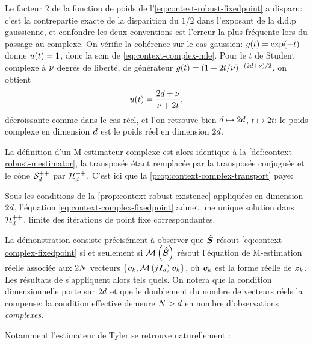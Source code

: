 \begin{remark}
  Le facteur $2$ de la fonction de poids de l'\cref{eq:context-robust-fixedpoint} a disparu: c'est la contrepartie exacte de la disparition du $1/2$ dans l'exposant de la d.d.p gaussienne, et confondre les deux conventions est l'erreur la plus fréquente lors du passage au complexe. On vérifie la cohérence sur le cas gaussien: $g(t)=\exp(-t)$ donne $u(t)=1$, donc la scm de \cref{eq:context-complex-mle}. Pour le $t$ de Student complexe à $\nu$ degrés de liberté, de générateur $g(t)=(1+2t/\nu)^{-(2d+\nu)/2}$, on obtient
  $$
  u(t) = \frac{2d+\nu}{\nu+2t},
  $$
  décroissante comme dans le cas réel, et l'on retrouve bien $d\mapsto2d$, $t\mapsto2t$: le poids complexe en dimension $d$ est le poids réel en dimension $2d$.
\end{remark}

La définition d'un M-estimateur complexe est alors identique à la \cref{def:context-robust-mestimator}, la transposée étant remplacée par la transposée conjuguée et le cône $\mathcal{S}_{d}^{++}$ par $\mathcal{H}_{d}^{++}$. C'est ici que la \cref{prop:context-complex-transport} paye:

\begin{proposition}
\label{prop:context-complex-existence}
  Sous les conditions de la \cref{prop:context-robust-existence} appliquées en dimension $2d$, l'équation \cref{eq:context-complex-fixedpoint} admet une unique solution dans $\mathcal{H}_{d}^{++}$, limite des itérations de point fixe correspondantes.
\end{proposition}

\begin{remark}
  La démonstration  consiste précisément à observer que $\hat{\boldsymbol{S}}$ résout \cref{eq:context-complex-fixedpoint} si et seulement si $\mathcal{M}\left(\hat{\boldsymbol{S}}\right)$ résout l'équation de M-estimation réelle associée aux $2N$ vecteurs $\{\boldsymbol{v}_k, \mathcal{M}\left(j\boldsymbol{I}_{d}\right)\boldsymbol{v}_k\}$, où $\boldsymbol{v}_k$ est la forme réelle de $\boldsymbol{z}_k$. Les résultats de \cite{Maronna76,Kent1991} s'appliquent alors tels quels. On notera que la condition dimensionnelle porte sur $2d$ et que le doublement du nombre de vecteurs réels la compense: la condition effective demeure $N>d$ en nombre d'observations \emph{complexes}.
\end{remark}

Notamment l'estimateur de Tyler se retrouve naturellement :

